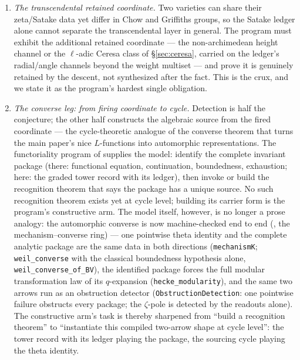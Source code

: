 \documentclass[11pt]{article}
\theoremstyle{definition}
\theoremstyle{remark}
\begin{document}
\begin{enumerate}
\item \emph{The transcendental retained coordinate.} Two varieties can share
their zeta/Satake data yet differ in Chow and Griffiths groups, so the Satake
ledger alone cannot separate the transcendental layer in general. The program
must exhibit the additional retained coordinate --- the non-archimedean height
channel or the $\ell$-adic Ceresa class of \S\ref{sec:ceresa}, carried on the
ledger's radial/angle channels beyond the weight multiset --- and prove it is
genuinely retained by the descent, not synthesized after the fact. This is the
crux, and we state it as the program's hardest single obligation.
\item \emph{The converse leg: from firing coordinate to cycle.} Detection is
half the conjecture; the other half constructs the algebraic source from the
fired coordinate --- the cycle-theoretic analogue of the converse theorem that
turns the main paper's nice $L$-functions into automorphic representations.
The functoriality program of \cite{Universal} supplies the model: identify the
complete invariant package (there: functional equation, continuation,
boundedness, exhaustion; here: the graded tower record with its ledger), then
invoke or build the recognition theorem that says the package has a unique
source. No such recognition theorem exists yet at cycle level; building its
carrier form is the program's constructive arm.  The model itself, however, is
no longer a prose analogy: the automorphic converse is now machine-checked end
to end (\cite{Universal}, the mechanism--converse ring) --- one pointwise theta
identity and the complete analytic package are the same data in both
directions (\texttt{mechanismK}; \texttt{weil\_converse} with the classical
boundedness hypothesis alone, \texttt{weil\_converse\_of\_BV}), the identified
package forces the full modular transformation law of its $q$-expansion
(\texttt{hecke\_modularity}), and the same two arrows run as an obstruction
detector (\texttt{ObstructionDetection}: one pointwise failure obstructs every
package; the $\zeta$-pole is detected by the readouts alone).  The
constructive arm's task is thereby sharpened from ``build a recognition
theorem'' to ``instantiate this compiled two-arrow shape at cycle level'':
the tower record with its ledger playing the package, the sourcing cycle
playing the theta identity.
\end{enumerate}
\end{document}
